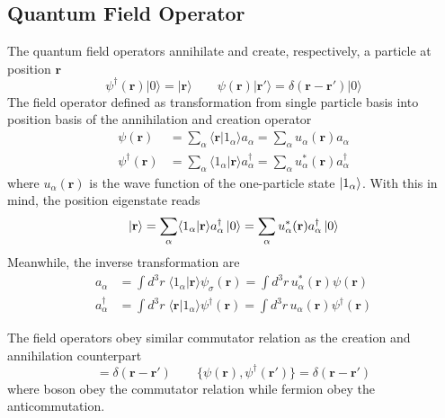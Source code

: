 \documentclass[../../../main.tex]{subfiles}
\begin{document}
\subsection{Quantum Field Operator}
The quantum field operators  annihilate and create, respectively, a particle at position $\mathbf{r}$
\begin{equation*}
  \psi^{\dagger}(\mathbf{r})|0\rangle = |\mathbf{r}\rangle\qquad
  \psi(\mathbf{r})|\mathbf{r}'\rangle = \delta(\mathbf{r} - \mathbf{r}')|0\rangle
\end{equation*}
The field operator defined as transformation from single particle basis into position basis of the annihilation and creation operator
\begin{align*}
  \psi(\mathbf{r})           & =  \sum_{\alpha} \langle \mathbf{r} | 1_ \alpha \rangle a_{\alpha} = \sum_{\alpha} u_{\alpha}(\mathbf{r}) a_{\alpha}                        \\
  \psi^{\dagger}(\mathbf{r}) & =  \sum_{\alpha} \langle 1_\alpha | \mathbf{r} \rangle a_{\alpha}^{\dagger} = \sum_{\alpha} u_{\alpha}^{*}(\mathbf{r}) a_{\alpha}^{\dagger}
\end{align*}
where $u_\alpha(\mathbf{r})$ is the wave function of the one-particle state $\ket{1_\alpha}$.
With this in mind, the position eigenstate reads 
\begin{equation*}
  \ket{\mathbf{r}} 
  =  \sum_{\alpha} \langle 1_\alpha | \mathbf{r} \rangle a_{\alpha}^{\dagger} \ket{0} 
  = \sum_{\alpha} u_{\alpha}^{*}(\mathbf{r}) a_{\alpha}^{\dagger} \ket{0}
\end{equation*}
Meanwhile, the inverse transformation are
\begin{align*}
  a_{\alpha}           & =  \int d^3 r \; \langle 1_{\alpha} | \mathbf{r} \rangle \psi_{\sigma} (\mathbf{r}) = \int d^3 r \, u_{\alpha}^{*} (\mathbf{r}) \psi (\mathbf{r})       \\
  a_{\alpha}^{\dagger} & =  \int d^3 r \; \langle\mathbf{r} | 1_{\alpha} \rangle \psi^{\dagger} (\mathbf{r}) = \int d^3 r \, u_{\alpha} (\mathbf{r}) \psi^{\dagger} (\mathbf{r})
\end{align*}

The field operators obey similar commutator relation as the creation and annihilation counterpart
\begin{equation*}
 [\psi(\mathbf{r }), \psi^{\dagger}(\mathbf{r}')] = \delta(\mathbf{r }-\mathbf{r}') \qquad
 \{\psi(\mathbf{r }), \psi^{\dagger}(\mathbf{r}')\} = \delta(\mathbf{r }-\mathbf{r}')  
\end{equation*}
where boson obey the commutator relation while fermion obey the anticommutation.
\end{document}
